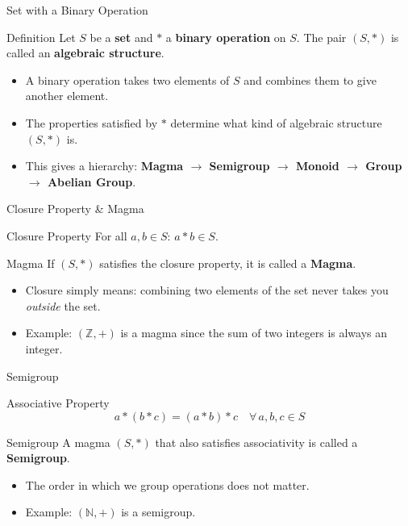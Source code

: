 \documentclass[9pt,aspectratio=169]{beamer}
\begin{document}
\begin{frame}{Set with a Binary Operation}
\begin{block}{Definition}
Let $S$ be a \textbf{set} and $*$ a \textbf{binary operation} on $S$. The pair $(S,*)$ is called an \textbf{algebraic structure}.
\end{block}
\begin{itemize}
\item A binary operation takes two elements of $S$ and combines them to give another element.
\item The properties satisfied by $*$ determine what kind of algebraic structure $(S,*)$ is.
\item This gives a hierarchy: \textbf{Magma $\to$ Semigroup $\to$ Monoid $\to$ Group $\to$ Abelian Group}.
\end{itemize}
\end{frame}

\begin{frame}{Closure Property \& Magma}
\begin{block}{Closure Property}
For all $a, b \in S$: \quad $a * b \in S$.
\end{block}
\begin{alertblock}{Magma}
If $(S,*)$ satisfies the closure property, it is called a \textbf{Magma}.
\end{alertblock}
\begin{itemize}
\item Closure simply means: combining two elements of the set never takes you \emph{outside} the set.
\item Example: $(\mathbb{Z}, +)$ is a magma since the sum of two integers is always an integer.
\end{itemize}
\end{frame}

\begin{frame}{Semigroup}
\begin{block}{Associative Property}
$$a * (b*c) = (a*b) * c \quad \forall\, a,b,c \in S$$
\end{block}
\begin{alertblock}{Semigroup}
A magma $(S,*)$ that also satisfies associativity is called a \textbf{Semigroup}.
\end{alertblock}
\begin{itemize}
\item The order in which we group operations does not matter.
\item Example: $(\mathbb{N}, +)$ is a semigroup.
\end{itemize}
\end{frame}
\end{document}
